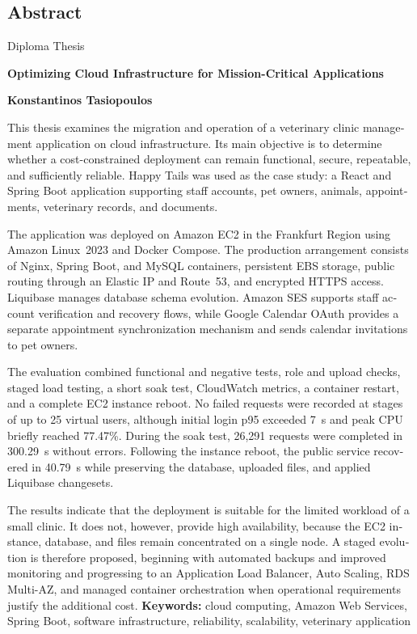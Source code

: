 \documentclass[12pt,a4paper,twoside,fleqn]{book}
\newcommand{\ThesisTitleEnglish}{Optimizing Cloud Infrastructure for Mission-Critical Applications}
\newcommand{\AuthorEnglish}{Konstantinos Tasiopoulos}
\newcommand{\blankpage}{%
  \clearpage
  \thispagestyle{empty}
  \null
  \clearpage
}
\begin{document}
\blankpage

\begin{english}
\chapter*{Abstract}
\begin{center}
  {\Large Diploma Thesis\par}
  \vspace{0.5cm}
  {\large\bfseries \ThesisTitleEnglish\par}
  \vspace{0.5cm}
  {\large\bfseries \AuthorEnglish\par}
\end{center}
This thesis examines the migration and operation of a veterinary clinic
management application on cloud infrastructure. Its main objective is to
determine whether a cost-constrained deployment can remain functional,
secure, repeatable, and sufficiently reliable. Happy Tails was used as the
case study: a React and Spring Boot application supporting staff accounts,
pet owners, animals, appointments, veterinary records, and documents.

The application was deployed on Amazon EC2 in the Frankfurt Region using
Amazon Linux~2023 and Docker Compose. The production arrangement consists of
Nginx, Spring Boot, and MySQL containers, persistent EBS storage, public
routing through an Elastic IP and Route~53, and encrypted HTTPS access.
Liquibase manages database schema evolution. Amazon SES supports staff
account verification and recovery flows, while Google Calendar OAuth
provides a separate appointment synchronization mechanism and sends calendar
invitations to pet owners.

The evaluation combined functional and negative tests, role and upload
checks, staged load testing, a short soak test, CloudWatch metrics, a
container restart, and a complete EC2 instance reboot. No failed requests
were recorded at stages of up to 25 virtual users, although initial login
p95 exceeded 7~s and peak CPU briefly reached 77.47\%. During the soak test,
26,291 requests were completed in 300.29~s without errors. Following the
instance reboot, the public service recovered in 40.79~s while preserving
the database, uploaded files, and applied Liquibase changesets.

The results indicate that the deployment is suitable for the limited
workload of a small clinic. It does not, however, provide high availability,
because the EC2 instance, database, and files remain concentrated on a
single node. A staged evolution is therefore proposed, beginning with
automated backups and improved monitoring and progressing to an Application
Load Balancer, Auto Scaling, RDS Multi-AZ, and managed container
orchestration when operational requirements justify the additional cost.
\vspace{0.6cm}
\noindent\textbf{Keywords:} cloud computing, Amazon Web Services, Spring Boot, software infrastructure, reliability, scalability, veterinary application
\end{english}
\end{document}
